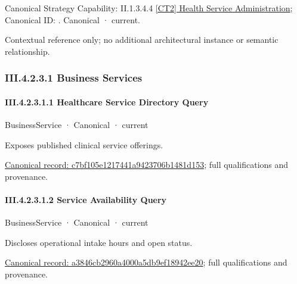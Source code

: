 {\small Canonical Strategy Capability: II.1.3.4.4 \hyperref[element:ba68a52913a0499d8377553bddfa74a4]{[CT2] Health Service Administration}; Canonical ID: \texttt{}. Canonical · current.}\par
Contextual reference only; no additional architectural instance or semantic relationship.\par
\subsubsection*{III.4.2.3.1 Business Services}
\label{navigation:III.4.2.3.1}

\paragraph*{III.4.2.3.1.1 Healthcare Service Directory Query}
\label{navigation:III.4.2.3.1.1}

\label{element:c7bf105e1217441a9423706b1481d153}
{\small BusinessService · Canonical · current}\par

Exposes published clinical service offerings.


{\footnotesize \href{../../../../continuum/business/business-service/c7bf105e1217441a9423706b1481d153.md}{Canonical record: c7bf105e1217441a9423706b1481d153}; full qualifications and provenance.}\par
\paragraph*{III.4.2.3.1.2 Service Availability Query}
\label{navigation:III.4.2.3.1.2}

\label{element:a3846cb2960a4000a5db9ef18942ee20}
{\small BusinessService · Canonical · current}\par

Discloses operational intake hours and open status.


{\footnotesize \href{../../../../continuum/business/business-service/a3846cb2960a4000a5db9ef18942ee20.md}{Canonical record: a3846cb2960a4000a5db9ef18942ee20}; full qualifications and provenance.}\par

